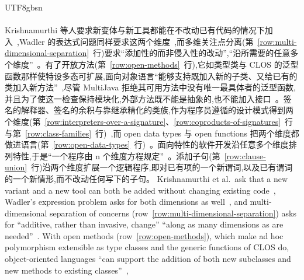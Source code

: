 \begin{CJK*}{UTF8}{gbsn}
\paragraph{}
\ifPaperChinese
Krishnamurthi 等人要求新变体与新工具都能在不改动已有代码的情况下加入~\cite[第~91~页]{krishnamurthi1998-synthesizing-object-oriented-functional},Wadler 的表达式问题同样要求这两个维度~\cite{wadler1998-expression-problem},而多维关注点分离(第~\ref{row:multi-dimensional-separation}~行)要求``添加性的而非侵入性的改动'',``沿所需要的任意多个维度''~\cite[第~109、112~页]{tarr1999-n-degrees-of-separation}。有了开放方法(第~\ref{row:open-methods}~行),它如类型类与 CLOS 的泛型函数那样使特设多态可扩展,面向对象语言``能够支持既加入新的子类、又给已有的类加入新方法''~\cite[第~130~页]{clifton2000-multijava}\cite[第~64、68~页]{wadler1989-type-classes}\cite{bobrow1988-clos-specification},尽管 MultiJava 拒绝其可用方法中没有唯一最具体者的泛型函数,并且为了使这一检查保持模块化,外部方法既不能是抽象的,也不能加入接口~\cite[第~134--135~页]{clifton2000-multijava}。签名的解释器、签名的余积与靠继承精化的类族,作为程序员遵循的设计模式得到两个维度(第~\ref{row:interpreters-over-a-signature}、\ref{row:coproducts-of-signatures}~行与第~\ref{row:class-families}~行)~\cite{carette2009-finally-tagless, oliveira2012-object-algebras, swierstra2008-data-types-a-la-carte, odersky2005-scalable-components, wang2016-expression-problem-trivially},而 open data types 与 open functions 把两个维度都做进语言(第~\ref{row:open-data-types}~行)~\cite{loh2006-open-data-types}。面向特性的软件开发沿任意多个维度排列特性,于是``一个程序由 n 个维度方程规定''~\cite[第~48、52~页]{batory2003-refinements-multi-dimensional}。添加子句(第~\ref{row:clause-union}~行)沿两个维度扩展一个逻辑程序,即对已有项的一个新谓词,以及已有谓词的一个新情形,而不改动任何写下的子句。
\else
Krishnamurthi et al.\ ask that a new variant and a new tool can both be added without changing existing
code~\cite[p.~91]{krishnamurthi1998-synthesizing-object-oriented-functional}, Wadler's expression
problem asks for both dimensions as well~\cite{wadler1998-expression-problem}, and multi-dimensional
separation of concerns (row~\ref{row:multi-dimensional-separation}) asks for ``additive, rather than
invasive, change'' ``along as many dimensions as are
needed''~\cite[pp.~109, 112]{tarr1999-n-degrees-of-separation}.
With open methods (row~\ref{row:open-methods}), which make ad hoc polymorphism extensible as type classes
and the generic functions of CLOS do, object-oriented languages ``can support the addition of both new
subclasses and new methods to existing classes''~\cite[p.~130]{clifton2000-multijava}\cite[pp.~64, 68]{wadler1989-type-classes}\cite{bobrow1988-clos-specification},

\end{CJK*}
